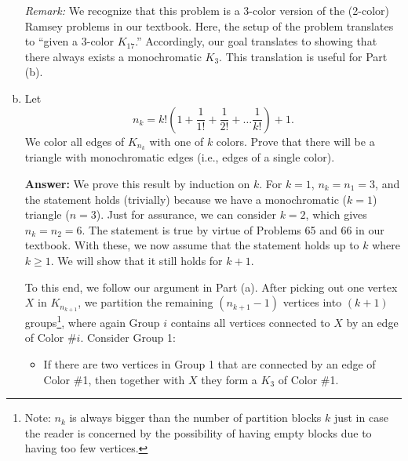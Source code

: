 \documentclass[11pt]{article}
\newcommand{\f}[2]{\frac{#1}{#2}}
\begin{document}
\begin{enumerate}[(a)]
	
	
	\textit{Remark:} We recognize that this problem is a 3-color version of the (2-color) Ramsey problems in our textbook. Here, the setup of the problem translates to ``given a 3-color $K_{17}$.'' Accordingly, our goal translates to showing that there always exists a monochromatic $K_3$. This translation is useful for Part (b).
	
	\item Let
	\begin{equation*}
	n_k = k! \left( 1 + \f{1}{1!}  + \f{1}{2!} + \dots \f{1}{k!} \right) + 1.
	\end{equation*}
	We color all edges of $K_{n_k}$ with one of $k$ colors. Prove that there will be a triangle with monochromatic edges (i.e., edges of a single color).
	
	\textbf{Answer:} We prove this result by induction on $k$. For $k=1$, $n_k = n_1 = 3$, and the statement holds (trivially) because we have a monochromatic ($k=1$) triangle ($n=3$). Just for assurance, we can consider $k=2$, which gives $n_k = n_2 = 6$. The statement is true by virtue of Problems 65 and 66 in our textbook.  With these, we now assume that the statement holds up to $k$ where $k\geq 1$. We will show that it still holds for $k+1$. 
	
	To this end, we follow our argument in Part (a). After picking out one vertex $X$ in $K_{n_{k+1}}$, we partition the remaining $(n_{k+1}-1)$ vertices into $(k+1)$ groups\footnote{Note: $n_k$ is always bigger than the number of partition blocks $k$ just in case the reader is concerned by the possibility of having empty blocks due to having too few vertices.}, where again Group $i$ contains all vertices connected to $X$ by an edge of Color \#$i$. Consider Group 1:
	\begin{itemize}
		\item If there are two vertices in Group 1 that are connected by an edge of Color \#1, then together with $X$ they form a $K_3$ of Color \#1.
		

\end{itemize}
\end{enumerate}
\end{document}
